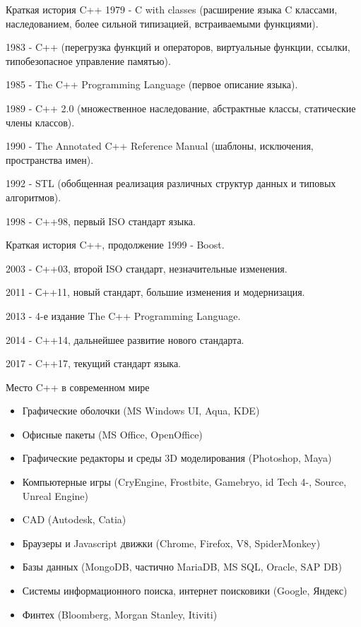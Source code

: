 \documentclass[unknownkeysallowed,xcolor=table]{beamer}
\begin{document}
\begin{frame}{Краткая история C++}
1979 - C with classes (расширение языка C классами, наследованием, более сильной типизацией, встраиваемыми функциями).

1983 - C++ (перегрузка функций и операторов, виртуальные функции, ссылки, типобезопасное управление памятью).

1985 - The C++ Programming Language (первое описание языка).

1989 - C++ 2.0 (множественное наследование, абстрактные классы, статические члены классов).

1990 - The Annotated C++ Reference Manual (шаблоны, исключения, пространства имен).

1992 - STL (обобщенная реализация различных структур данных и типовых алгоритмов).

1998 - C++98, первый ISO стандарт языка.
\end{frame}

\begin{frame}{Краткая история C++, продолжение}
1999 - Boost.

2003 - C++03, второй ISO стандарт, незначительные изменения.

2011 - С++11, новый стандарт, большие изменения и модернизация.

2013 - 4-е издание The C++ Programming Language.

2014 - C++14, дальнейшее развитие нового стандарта.

2017 - C++17, текущий стандарт языка.
\end{frame}

\begin{frame}{Место C++ в современном мире}
\begin{itemize}
  \item Графические оболочки (MS Windows UI, Aqua, KDE)
  \item Офисные пакеты (MS Office, OpenOffice)
  \item Графические редакторы и среды 3D моделирования (Photoshop, Maya)
  \item Компьютерные игры (CryEngine, Frostbite, Gamebryo, id Tech 4-, Source, Unreal Engine)
  \item CAD (Autodesk, Catia)
  \item Браузеры и Javascript движки (Chrome, Firefox, V8, SpiderMonkey)
  \item Базы данных (MongoDB, частично MariaDB, MS SQL, Oracle, SAP DB)
  \item Системы информационного поиска, интернет поисковики (Google, Яндекс)
  \item Финтех (Bloomberg, Morgan Stanley, Itiviti)
\end{itemize}
\end{frame}
\end{document}
